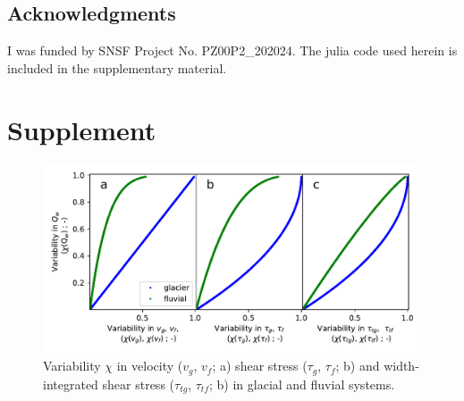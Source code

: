 \documentclass[11pt]{article}
\begin{document}
\begin{spacing}{1}
  \section{Acknowledgments}

  I was funded by SNSF Project No. PZ00P2\_202024.
  The julia code used herein is included in the supplementary material.

  
\end{spacing}





\section{Supplement}

\begin{center}
  \begin{figure}[H]
    \includegraphics[width=0.9\linewidth]{multi_run_vars.pdf}
    \caption{Variability $\chi$ in velocity ($v_g$, $v_f$; a) shear stress ($\tau_g$, $\tau_f$; b) and width-integrated shear stress ($\tau_{tg}$, $\tau_{tf}$; b)  in glacial and fluvial systems. }
    \label{fig:gammas}
  \end{figure}
\end{center}
\end{document}
